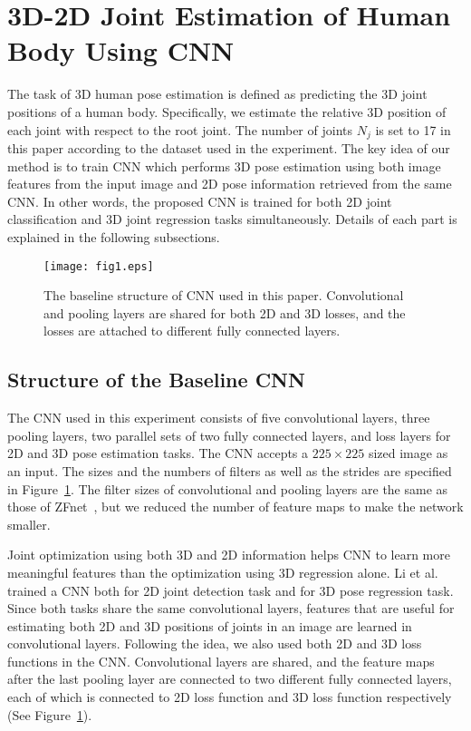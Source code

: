 \documentclass[runningheads]{llncs}
\begin{document}
\section{3D-2D Joint Estimation of Human Body Using CNN}
\label{sec:cnn}
The task of 3D human pose estimation is defined as predicting the 3D joint positions of a human body. Specifically, we estimate the relative 3D position of each joint with respect to the root joint. The number of joints $N_j$ is set to 17 in this paper according to the dataset used in the experiment. The key idea of our method is to train CNN which performs 3D pose estimation using both image features from the input image and 2D pose information retrieved from the same CNN. In other words, the proposed CNN is trained for both 2D joint classification and 3D joint regression tasks simultaneously. Details of each part is explained in the following subsections.

\begin{figure}[t]
\centering
   \texttt{[image: fig1.eps]}
    \caption{The baseline structure of CNN used in this paper. Convolutional and pooling layers are shared for both 2D and 3D losses, and the losses are attached to different fully connected layers.}
    \label{fig1}
\end{figure}

\subsection{Structure of the Baseline CNN}
The CNN used in this experiment consists of five convolutional layers, three pooling layers, two parallel sets of two fully connected layers, and loss layers for 2D and 3D pose estimation tasks. The CNN accepts a $225\times225$ sized image as an input. The sizes and the numbers of filters as well as the strides are specified in Figure~\ref{fig1}. The filter sizes of convolutional and pooling layers are the same as those of ZFnet~\cite{zeiler2014visualizing}, but we reduced the number of feature maps to make the network smaller.

Joint optimization using both 3D and 2D information helps CNN to learn more meaningful features than the optimization using 3D regression alone. Li et al.~\cite{li20143d} trained a CNN both for 2D joint detection task and for 3D pose regression task. Since both tasks share the same convolutional layers, features that are useful for estimating both 2D and 3D positions of joints in an image are learned in convolutional layers. Following the idea, we also used both 2D and 3D loss functions in the CNN. Convolutional layers are shared, and the feature maps after the last pooling layer are connected to two different fully connected layers, each of which is connected to 2D loss function and 3D loss function respectively (See Figure~\ref{fig1}).
\end{document}
